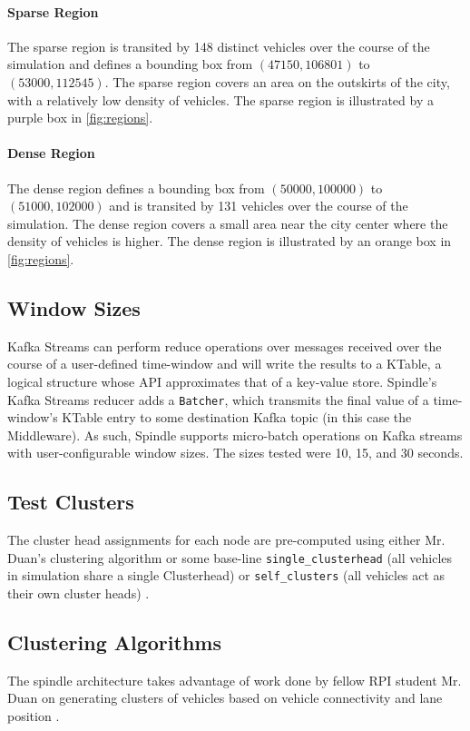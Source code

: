 \documentclass{thesis}
\begin{document}
    \paragraph{Sparse Region}
        The sparse region is transited by 148 distinct vehicles over the course of the simulation and defines a bounding
        box from $(47150, 106801)$ to $(53000, 112545)$. The sparse region covers an area on the outskirts of the city,
        with a relatively low density of vehicles. The sparse region is illustrated by a purple box in \ref{fig:regions}.
    \paragraph{Dense Region}
        The dense region defines a bounding box from $(50000, 100000)$ to $(51000, 102000)$ and is transited by
        131 vehicles over the course of the simulation. The dense region covers a small area near the city center
        where the density of vehicles is higher. The dense region is illustrated by an orange box in \ref{fig:regions}.

\subsection{Window Sizes}
    Kafka Streams can perform reduce operations over messages received over the course of a user-defined time-window
    and will write the results to a KTable, a logical structure whose API approximates that of a key-value store. %
    Spindle's Kafka Streams reducer adds a \verb|Batcher|, which transmits the final value of a time-window's KTable
    entry to some destination Kafka topic (in this case the Middleware). As such, Spindle supports micro-batch operations
    on Kafka streams with user-configurable window sizes. The sizes tested were 10, 15, and 30 seconds.
\subsection{Test Clusters}
    The cluster head assignments for each node are pre-computed using either Mr. Duan's
    clustering algorithm or some base-line \verb|single_clusterhead| (all vehicles in simulation share a single Clusterhead)
    or \verb|self_clusters| (all vehicles act as their own cluster heads) \cite{xiaotian}.
\subsection{Clustering Algorithms}
    The spindle architecture takes advantage of work done by fellow RPI student Mr. Duan on generating
    clusters of vehicles based on vehicle connectivity and lane position \cite{xiaotian}. 
\end{document}
